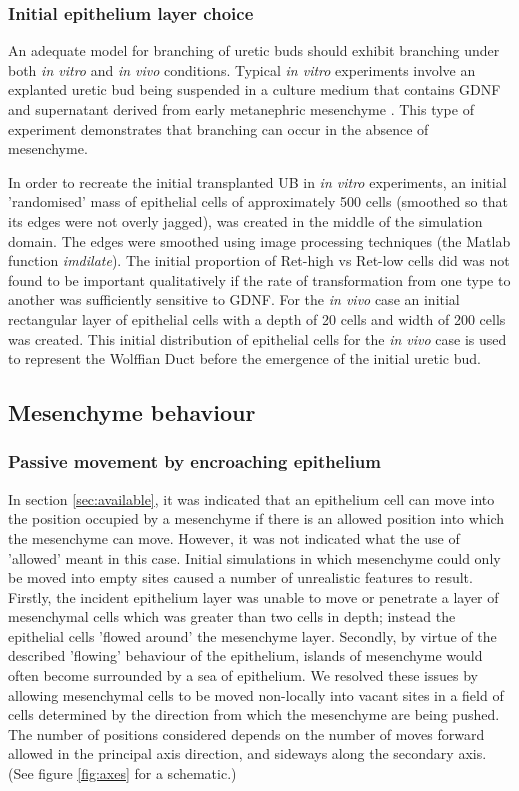 \documentclass[pdftex,10pt,a4paper,twocolumn]{article}
\begin{document}
\subsubsection{Initial epithelium layer choice}
An adequate model  for branching of uretic buds should exhibit branching under both \textit{in vitro} and \textit{in vivo} conditions. Typical \textit{in vitro} experiments involve an explanted uretic bud being suspended in a culture medium that contains GDNF and supernatant derived from early metanephric mesenchyme \cite{qiao1999branching}. This type of experiment demonstrates that branching can occur in the absence of mesenchyme.

In order to recreate the initial transplanted UB in \textit{in vitro} experiments, an initial 'randomised' mass of epithelial cells of approximately 500 cells (smoothed so that its edges were not overly jagged), was created in the middle of the simulation domain. The edges were smoothed using image processing techniques (the Matlab function \textit{imdilate}). The initial proportion of Ret-high vs Ret-low cells did was not found to be important qualitatively if the rate of transformation from one type to another was sufficiently sensitive to GDNF. For the \textit{in vivo} case an initial rectangular layer of epithelial cells with a depth of 20 cells and width of 200 cells was created. This initial distribution of epithelial cells for the \textit{in vivo} case is used to represent the Wolffian Duct before the emergence of the initial uretic bud.

\subsection{Mesenchyme behaviour}\label{sec:mesenchyme}
\subsubsection{Passive movement by encroaching epithelium}\label{sec:mespassive}
In section \ref{sec:available}, it was indicated that an epithelium cell can move into the position occupied by a mesenchyme if there is an allowed position into which the mesenchyme can move. However, it was not indicated what the use of 'allowed' meant in this case. Initial simulations in which mesenchyme could only be moved into empty sites caused a number of unrealistic features to result. Firstly, the incident epithelium layer was unable to move or penetrate a layer of mesenchymal cells which was greater than two cells in depth; instead the epithelial cells 'flowed around' the mesenchyme layer. Secondly, by virtue of the described 'flowing' behaviour of the epithelium, islands of mesenchyme would often become surrounded by a sea of epithelium. We resolved these issues by allowing mesenchymal cells to be moved non-locally into vacant sites in a field of cells determined by the direction from which the mesenchyme are being pushed. The number of positions considered depends on the number of moves forward allowed in the principal axis direction, and sideways along the secondary axis. (See figure \ref{fig:axes} for a schematic.)
\end{document}

